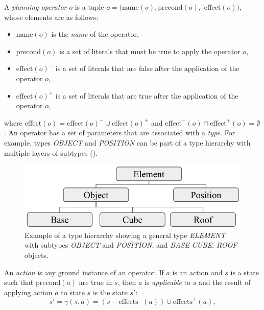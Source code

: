 \begin{definition}\label{def:operator}
A \textit{planning operator} $o$ is a tuple $o = (\text{name}(o), \text{precond}(o),$ $\text{effect}(o))$, whose elements are as follows:
\begin{itemize}
	\item $\text{name}(o)$ is the {\em name} of the operator,
	\item $\text{precond}(o)$ is a set of literals that must be true to apply the operator $o$,
	\item $\text{effect}(o)^{-}$ is a set of literals that are false after the application of the operator $o$,
	\item $\text{effect}(o)^{+}$ is a set of literals that are true after the application of the operator $o$,
\end{itemize}
\end{definition}
where $\text{effect}(o) = \text{effect}(o)^{-} \cup \text{effect}(o)^{+}$ and $\text{effect}^{-}(o) \cap \text{effect}^{+}(o) = \emptyset$. 
An operator has a set of parameters that are associated with a \textit{type}.
For example, types \textit{OBJECT} and \textit{POSITION} can be part of a type hierarchy with multiple layers of subtypes (). %

\begin{figure}[ht]
	\centering
	\includegraphics[width=0.7\linewidth]{figures/object-type-hierarchy}
	\caption{Example of a type hierarchy showing a general type \textit{ELEMENT} with subtypes \textit{OBJECT} and \textit{POSITION}, and \textit{BASE} \textit{CUBE}, \textit{ROOF} objects.}
	\label{fig:object-type-hierarchy}
\end{figure}


\begin{definition}\label{def:action}
	An \textit{action} is any ground instance of an operator. 
	If $a$ is an action and $s$ is a state such that $\text{precond}(a)$ are true in $s$, then $a$ is {\em applicable} to $s$ and the result of applying action $a$ to state $s$ is the state $s'$:  
	\begin{equation}\label{eq:statetrans}
		s' = \gamma(s, a) = (s - \text{effects}^{-}(a)) \cup \text{effects}^{+}(a),
	\end{equation}
	
\end{definition}

